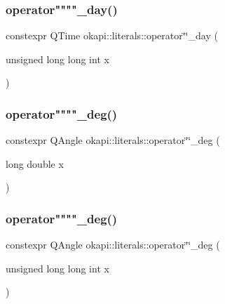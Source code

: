 \mbox{\label{namespaceokapi_1_1literals_a323a83894d9b82367a9a5e4ed103bb42}} 
\subsubsection{\texorpdfstring{operator""""\_day()}{operator""\_day()}\hspace{0.1cm}{\footnotesize\ttfamily [2/2]}}
{\footnotesize\ttfamily constexpr Q\+Time okapi\+::literals\+::operator\char`\"{}\char`\"{}\+\_\+day (\begin{DoxyParamCaption}\item[{unsigned long long int}]{x }\end{DoxyParamCaption})}

\mbox{\label{namespaceokapi_1_1literals_afc22181ee7d38722369c5f4cb685e641}} 
\subsubsection{\texorpdfstring{operator""""\_deg()}{operator""\_deg()}\hspace{0.1cm}{\footnotesize\ttfamily [1/2]}}
{\footnotesize\ttfamily constexpr Q\+Angle okapi\+::literals\+::operator\char`\"{}\char`\"{}\+\_\+deg (\begin{DoxyParamCaption}\item[{long double}]{x }\end{DoxyParamCaption})}

\mbox{\label{namespaceokapi_1_1literals_abbb7d5973f364cb7d6778d14409693eb}} 
\subsubsection{\texorpdfstring{operator""""\_deg()}{operator""\_deg()}\hspace{0.1cm}{\footnotesize\ttfamily [2/2]}}
{\footnotesize\ttfamily constexpr Q\+Angle okapi\+::literals\+::operator\char`\"{}\char`\"{}\+\_\+deg (\begin{DoxyParamCaption}\item[{unsigned long long int}]{x }\end{DoxyParamCaption})}

